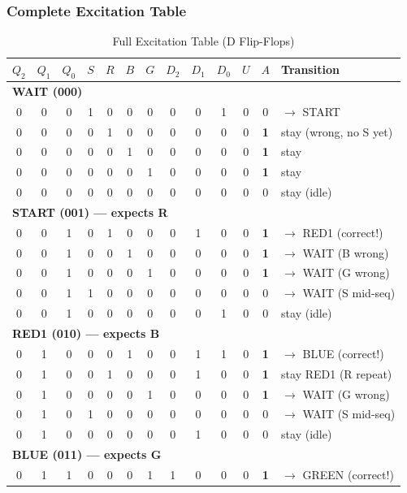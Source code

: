\documentclass[12pt,a4paper]{article}
\begin{document}
\subsubsection{Complete Excitation Table}

\begin{table}[H]
\centering
\footnotesize
\caption{Full Excitation Table (D Flip-Flops)}
\begin{tabular}{ccc|cccc|ccc|cc|l}
\toprule
$Q_2$ & $Q_1$ & $Q_0$ & $S$ & $R$ & $B$ & $G$ & $D_2$ & $D_1$ & $D_0$ & $U$ & $A$ & Transition \\
\midrule
\multicolumn{13}{l}{\cellcolor{blue!8}\textbf{WAIT (000)}} \\
0&0&0 & 1&0&0&0 & 0&0&1 & 0&0 & $\to$ START \\
0&0&0 & 0&1&0&0 & 0&0&0 & 0&\textbf{1} & stay (wrong, no S yet) \\
0&0&0 & 0&0&1&0 & 0&0&0 & 0&\textbf{1} & stay \\
0&0&0 & 0&0&0&1 & 0&0&0 & 0&\textbf{1} & stay \\
0&0&0 & 0&0&0&0 & 0&0&0 & 0&0 & stay (idle) \\
\midrule
\multicolumn{13}{l}{\cellcolor{yellow!8}\textbf{START (001) --- expects R}} \\
0&0&1 & 0&1&0&0 & 0&1&0 & 0&\textbf{1} & $\to$ RED1 (correct!) \\
0&0&1 & 0&0&1&0 & 0&0&0 & 0&\textbf{1} & $\to$ WAIT (B wrong) \\
0&0&1 & 0&0&0&1 & 0&0&0 & 0&\textbf{1} & $\to$ WAIT (G wrong) \\
0&0&1 & 1&0&0&0 & 0&0&0 & 0&0 & $\to$ WAIT (S mid-seq) \\
0&0&1 & 0&0&0&0 & 0&0&1 & 0&0 & stay (idle) \\
\midrule
\multicolumn{13}{l}{\cellcolor{red!8}\textbf{RED1 (010) --- expects B}} \\
0&1&0 & 0&0&1&0 & 0&1&1 & 0&\textbf{1} & $\to$ BLUE (correct!) \\
0&1&0 & 0&1&0&0 & 0&1&0 & 0&\textbf{1} & stay RED1 (R repeat) \\
0&1&0 & 0&0&0&1 & 0&0&0 & 0&\textbf{1} & $\to$ WAIT (G wrong) \\
0&1&0 & 1&0&0&0 & 0&0&0 & 0&0 & $\to$ WAIT (S mid-seq) \\
0&1&0 & 0&0&0&0 & 0&1&0 & 0&0 & stay (idle) \\
\midrule
\multicolumn{13}{l}{\cellcolor{cyan!8}\textbf{BLUE (011) --- expects G}} \\
0&1&1 & 0&0&0&1 & 1&0&0 & 0&\textbf{1} & $\to$ GREEN (correct!) \\

\end{tabular}
\end{table}
\end{document}
